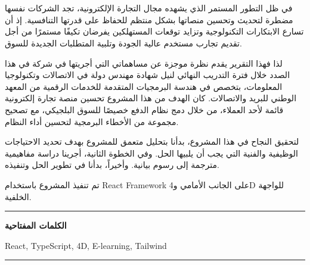 \chapter*{}

\begin{RLtext}

 \noindent\hspace{10pt} 
 
 في ظل التطور المستمر الذي يشهده مجال التجارة الإلكترونية، تجد الشركات نفسها مضطرة لتحديث وتحسين منصاتها بشكل منتظم للحفاظ على قدرتها التنافسية. إذ أن تسارع الابتكارات التكنولوجية وتزايد توقعات المستهلكين يفرضان تكيفًا مستمرًا من أجل تقديم تجارب مستخدم عالية الجودة وتلبية المتطلبات الجديدة للسوق.

 \vspace{10pt}

لذا فهذا التقرير يقدم نظرة موجزة عن مساهماتي التي أجريتها في شركة  في هذا الصدد خلال فترة التدريب النهائي لنيل شهادة مهندس دولة في الاتصالات وتكنولوجيا المعلومات، بتخصص في هندسة البرمجيات المتقدمة للخدمات الرقمية من المعهد الوطني للبريد والاتصالات. كان الهدف من هذا المشروع تحسين منصة تجارة إلكترونية قائمة لأحد العملاء، من خلال دمج نظام الدفع  خصيصًا للسوق البلجيكي، مع تصحيح مجموعة من الأخطاء البرمجية لتحسين أداء النظام.
 \vspace{10pt}

 لتحقيق النجاح في هذا المشروع، بدأنا بتحليل متعمق للمشروع بهدف تحديد الاحتياجات الوظيفية والفنية التي يجب أن يلبيها الحل. وفي الخطوة الثانية، أجرينا دراسة مفاهيمية مترجمة إلى رسوم بيانية. وأخيراً، بدأنا في تطوير الحل وتنفيذه.

 \vspace{10pt}

 تم تنفيذ المشروع باستخدام React Framework على الجانب الأمامي و4D للواجهة الخلفية.

 \vspace{10pt}


\end{RLtext}

\noindent\rule[2pt]{\textwidth}{0.5pt}

\begin{RLtext}
    {\textbf{الكلمات المفتاحية}}
    \end{RLtext}
    \hfill
    React, TypeScript, 4D, E-learning, Tailwind
    



\noindent\rule[2pt]{\textwidth}{0.5pt}